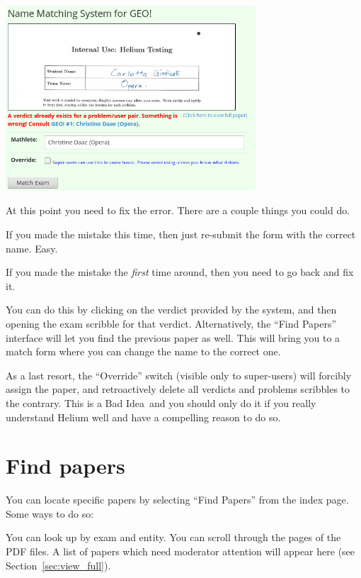 \begin{center}
	\includegraphics[width=0.7\textwidth]{images/matchconflict.png}
\end{center}

At this point you need to fix the error.
There are a couple things you could do.
\begin{itemize}
	\ii If you made the mistake this time,
	then just re-submit the form with the correct name. Easy.

	\ii If you made the mistake the \emph{first} time around,
	then you need to go back and fix it.

	You can do this by clicking on the verdict provided by the system,
	and then opening the exam scribble for that verdict.
	Alternatively, the ``Find Papers'' interface will let you find
	the previous paper as well.
	This will bring you to a match form where you can change the
	name to the correct one.

	\ii As a last resort,
	the ``Override'' switch (visible only to super-users)
	will forcibly assign the paper,
	and retroactively delete all verdicts and
	problems scribbles to the contrary.
	This is a Bad Idea\texttrademark\ and you should only do it
	if you really understand Helium well and have a compelling reason to do so.
\end{itemize}

\section{Find papers}
You can locate specific papers
by selecting ``Find Papers'' from the index page.
Some ways to do so:
\begin{itemize}
	\ii You can look up by exam and entity.
	\ii You can scroll through the pages of the PDF files.
	\ii A list of papers which need moderator attention
	will appear here (see Section~\ref{sec:view_full}).
\end{itemize}

